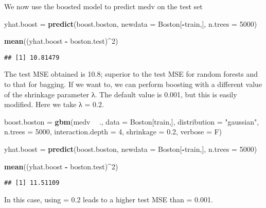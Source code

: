 \documentclass[]{article}
\newenvironment{Shaded}{\begin{snugshade}}{\end{snugshade}}
\newcommand{\KeywordTok}[1]{\textcolor[rgb]{0.13,0.29,0.53}{\textbf{#1}}}
\newcommand{\DataTypeTok}[1]{\textcolor[rgb]{0.13,0.29,0.53}{#1}}
\newcommand{\DecValTok}[1]{\textcolor[rgb]{0.00,0.00,0.81}{#1}}
\newcommand{\FloatTok}[1]{\textcolor[rgb]{0.00,0.00,0.81}{#1}}
\newcommand{\StringTok}[1]{\textcolor[rgb]{0.31,0.60,0.02}{#1}}
\newcommand{\OperatorTok}[1]{\textcolor[rgb]{0.81,0.36,0.00}{\textbf{#1}}}
\newcommand{\NormalTok}[1]{#1}
\begin{document}
We now use the boosted model to predict medv on the test set

\begin{Shaded}
\begin{Highlighting}[]
\NormalTok{yhat.boost =}\StringTok{ }\KeywordTok{predict}\NormalTok{(boost.boston, }\DataTypeTok{newdata =}\NormalTok{ Boston[}\OperatorTok{-}\NormalTok{train,], }
                   \DataTypeTok{n.trees =} \DecValTok{5000}\NormalTok{)}

\KeywordTok{mean}\NormalTok{((yhat.boost }\OperatorTok{-}\StringTok{ }\NormalTok{boston.test)}\OperatorTok{^}\DecValTok{2}\NormalTok{)}
\end{Highlighting}
\end{Shaded}

\begin{verbatim}
## [1] 10.81479
\end{verbatim}

The test MSE obtained is 10.8; superior to the test MSE for random
forests and to that for bagging. If we want to, we can perform boosting
with a different value of the shrinkage parameter λ. The default value
is 0.001, but this is easily modified. Here we take λ = 0.2.

\begin{Shaded}
\begin{Highlighting}[]
\NormalTok{boost.boston =}\StringTok{ }\KeywordTok{gbm}\NormalTok{(medv }\OperatorTok{~}\StringTok{ }\NormalTok{., }\DataTypeTok{data =}\NormalTok{ Boston[train,],}
                 \DataTypeTok{distribution =} \StringTok{"gaussian"}\NormalTok{,}
                 \DataTypeTok{n.trees =} \DecValTok{5000}\NormalTok{, }\DataTypeTok{interaction.depth =} \DecValTok{4}\NormalTok{,}
                 \DataTypeTok{shrinkage =} \FloatTok{0.2}\NormalTok{, }
                 \DataTypeTok{verbose =}\NormalTok{ F)}

\NormalTok{yhat.boost =}\StringTok{ }\KeywordTok{predict}\NormalTok{(boost.boston, }\DataTypeTok{newdata =}\NormalTok{ Boston[}\OperatorTok{-}\NormalTok{train,], }
                     \DataTypeTok{n.trees =} \DecValTok{5000}\NormalTok{)}

\KeywordTok{mean}\NormalTok{((yhat.boost }\OperatorTok{-}\StringTok{ }\NormalTok{boston.test)}\OperatorTok{^}\DecValTok{2}\NormalTok{)}
\end{Highlighting}
\end{Shaded}

\begin{verbatim}
## [1] 11.51109
\end{verbatim}

In this case, using = 0.2 leads to a higher test MSE than = 0.001.
\end{document}
